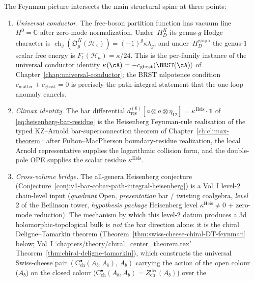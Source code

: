 \begin{remark}
\label{rem:feynman-anchors}
The Feynman picture intersects the main structural spine at three
points:
\begin{enumerate}[label=\textup{(W\arabic*)}]
\item \emph{Universal conductor.} The free-boson partition function
 has vacuum line $H^0=\mathbb{C}$ after zero-mode normalization.
 Under~$H_D^K$ its genus-$g$ Hodge character is
 $\operatorname{ch}_g(\mathfrak O_g^K(\mathcal H_\kappa))
 =(-1)^g\kappa\lambda_g$, and under~$H_D^{\mathrm{graph}}$ the
 genus-$1$ scalar free energy is
 $F_1(\mathcal{H}_\kappa)=\kappa/24$.  This is the
 per-family instance of the
 universal conductor identity $\kappa(\cA) = -c_{\mathrm{ghost}}(\BRST(\cA))$
 of Chapter~\ref{chap:universal-conductor}; the BRST nilpotence
 condition $c_{\mathrm{matter}} + c_{\mathrm{ghost}} = 0$ is
 precisely the path-integral statement that the one-loop
 anomaly cancels.
\item \emph{Climax identity.} The bar differential
$d^{(0)}_{\mathrm{res}}[a \otimes a \otimes \eta_{12}]
= \kappa^{\mathrm{Heis}} \cdot \mathbf{1}$
of \eqref{eq:heisenberg-bar-residue} is the Heisenberg
Feynman-rule realisation of the typed KZ--Arnold
bar-superconnection theorem of Chapter~\ref{ch:climax-theorem}:
after Fulton--MacPherson boundary-residue realization, the local
Arnold representative supplies the logarithmic collision form, and the
double-pole OPE supplies the scalar residue
$\kappa^{\mathrm{Heis}}$.
\item \emph{Cross-volume bridge.} The all-genera Heisenberg
 conjecture (Conjecture~\ref{conj:v1-bar-cobar-path-integral-heisenberg})
 is a Vol~I level-2 chain-level input
 (\emph{quadrant} Open, \emph{presentation} bar / twisting coalgebra,
 \emph{level} 2 of the Beilinson tower,
 \emph{hypothesis package} Heisenberg level
 $\kappa^{\mathrm{Heis}} \neq 0$ + zero-mode reduction).
 The mechanism by which this level-2 datum produces a
 $3$d holomorphic-topological bulk is \emph{not} the bar direction
 alone: it is the chiral Deligne--Tamarkin theorem
 (Theorem~\ref{thm:swiss-cheese-chiral-DT-feynman} below;
 Vol~I `chapters/theory/chiral_center_theorem.tex'
 Theorem~\ref{thm:chiral-deligne-tamarkin}), which constructs the
 universal Swiss-cheese pair
 $(\mathrm{C}^\bullet_{\mathrm{ch}}(A_b, A_b),\, A_b)$
 carrying the action of the open colour ($A_b$) on the closed
 colour ($\mathrm{C}^\bullet_{\mathrm{ch}}(A_b, A_b) =
 Z^{\mathrm{der}}_{\mathrm{ch}}(A_b)$) over the

\end{enumerate}
\end{remark}
